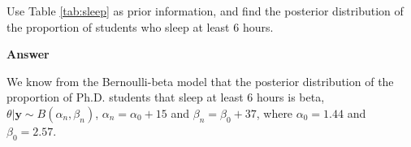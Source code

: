 \begin{enumerate}[leftmargin=*]
\begin{table}[!htbp]
\begin{tabular}{cccccccccccc}
	\end{tabular}
\end{table}
Use Table \ref{tab:sleep} as prior information, and find the posterior distribution of the proportion of students who sleep at least 6 hours.

\textbf{Answer}

We know from the Bernoulli-beta model that the posterior distribution of the proportion of Ph.D. students that sleep at least 6 hours is beta, $\theta|\bm{y}\sim B(\alpha_n,\beta_n)$, $\alpha_n=\alpha_0+15$ and $\beta_n=\beta_0+37$, where $\alpha_0=1.44$ and $\beta_0=2.57$. 


\end{enumerate}
